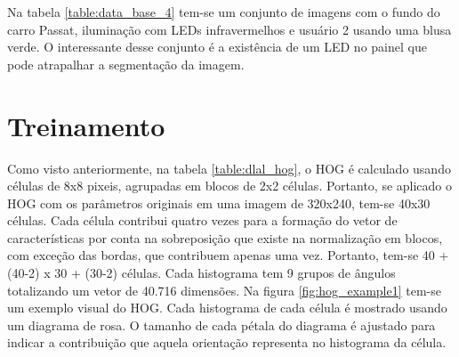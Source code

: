 

Na tabela \ref{table:data_base_4} tem-se um conjunto de imagens com o fundo do carro Passat, iluminação com LEDs infravermelhos e usuário 2 usando uma blusa verde. O interessante desse conjunto é a existência de um LED no painel que pode atrapalhar a segmentação da imagem.


\section{Treinamento}

Como visto anteriormente, na tabela \ref{table:dlal_hog}, o HOG é calculado usando células de 8x8 pixeis, agrupadas em blocos de 2x2 células. Portanto, se aplicado o HOG com os parâmetros originais em uma imagem de 320x240, tem-se 40x30 células. Cada célula contribui quatro vezes para a formação do vetor de características por conta na sobreposição que existe na normalização em blocos, com exceção das bordas, que contribuem apenas uma vez. Portanto, tem-se 40 + (40-2) x 30 + (30-2) células. Cada histograma tem 9 grupos de ângulos totalizando um vetor de 40.716 dimensões. Na figura \ref{fig:hog_example1} tem-se um exemplo visual do HOG. Cada histograma de cada célula é mostrado usando um diagrama de rosa. O tamanho de cada pétala do diagrama é ajustado para indicar a contribuição que aquela orientação representa no histograma da célula. 


